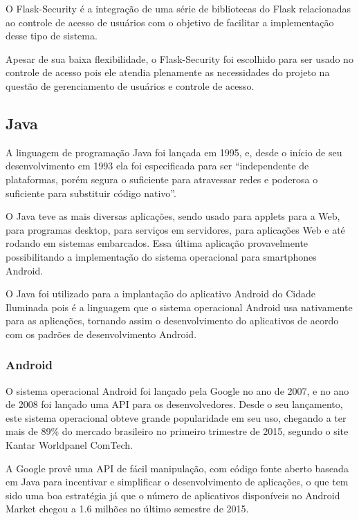 \documentclass[
	article,			%
	11pt,				%
	oneside,			%
	a4paper,			%
	english,			%
	brazil,				%
	sumario=tradicional
	]{abntex2}
\begin{document}
O Flask-Security é a integração de uma série de bibliotecas do Flask
relacionadas ao controle de acesso de usuários com o objetivo de facilitar a
implementação desse tipo de sistema. \cite{flasksecurity}

Apesar de sua baixa flexibilidade, o Flask-Security foi escolhido para ser
usado no controle de acesso pois ele atendia plenamente as necessidades do
projeto na questão de gerenciamento de usuários e controle de acesso.


\subsection{Java}

A linguagem de programação Java foi lançada em 1995, e, desde o início de seu
desenvolvimento em 1993 ela foi especificada para ser “independente de plataformas,
porém segura o suficiente para atravessar redes e poderosa o suficiente para
substituir código nativo”. \cite{java}

O Java teve as mais diversas aplicações, sendo usado para applets para a Web,
para programas desktop, para serviços em servidores, para aplicações Web e até
rodando em sistemas embarcados. Essa última aplicação provavelmente
possibilitando a implementação do sistema operacional para smartphones Android.

O Java foi utilizado para a implantação do aplicativo Android do Cidade
Iluminada pois é a linguagem que o sistema operacional Android usa
nativamente para as aplicações, tornando assim o desenvolvimento do aplicativos
de acordo com os padrões de desenvolvimento Android.


\subsubsection{Android}

O sistema operacional Android foi lançado pela Google no ano de 2007, e no ano
de 2008 foi lançado uma API para os desenvolvedores. Desde o seu lançamento,
este sistema operacional obteve grande popularidade em seu uso, chegando a ter
mais de 89\% do mercado brasileiro no primeiro trimestre de 2015, segundo o site
Kantar Worldpanel ComTech. \cite{comtech}

A Google provê uma API de fácil manipulação, com código fonte aberto baseada em
Java para incentivar e simplificar o desenvolvimento de aplicações, o que tem
sido uma boa estratégia já que o número de aplicativos disponíveis no Android
Market chegou a 1.6 milhões no último semestre de 2015.
\end{document}
